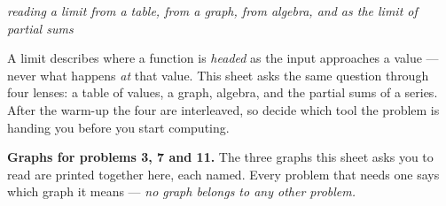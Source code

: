\documentclass[12pt]{article}
\begin{document}

\begin{center}
\textit{reading a limit from a table, from a graph, from algebra, and as the
limit of partial sums}
\end{center}

\noindent A limit describes where a function is \emph{headed} as the input
approaches a value --- never what happens \emph{at} that value. This sheet asks
the same question through four lenses: a table of values, a graph, algebra, and
the partial sums of a series. After the warm-up the four are interleaved, so
decide which tool the problem is handing you before you start computing.

\medskip
\noindent\textbf{Graphs for problems 3, 7 and 11.} The three graphs this sheet
asks you to read are printed together here, each named. Every problem that needs
one says which graph it means --- \emph{no graph belongs to any other problem.}
\end{document}
